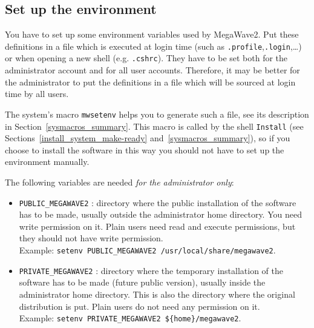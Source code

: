 


\subsection{Set up the environment}
\label{install_system_set-up}

You have to set up some environment variables used by MegaWave2.
Put these definitions in a file which is executed at login time (such as \verb+.profile+,\verb+.login+,\ldots) or when opening a new shell (e.g. \verb+.cshrc+).
They have to be set both for the administrator account and for all user accounts.
Therefore, it may be better for the administrator to put the definitions in a file which will be sourced at login time by all users.

The system's macro \verb+mwsetenv+ helps you to generate such a file, 
see its description in Section~\ref{sysmacros_summary}. 
This macro is called by the shell \verb+Install+ (see 
Sections~\ref{install_system_make-ready} and~\ref{sysmacros_summary}), so if you choose to install the software
in this way you should not have to set up the environment manually.

The following variables are needed {\em for the administrator only}:
\begin{itemize}
\item \verb+PUBLIC_MEGAWAVE2+ : 
directory where the public installation of the software has to be made, 
usually outside the administrator home directory.
You need write permission on it. Plain users need read and execute permissions, but they should not have write 
permission.\\
\nopagebreak
Example: \verb+setenv PUBLIC_MEGAWAVE2 /usr/local/share/megawave2+.
\item \verb+PRIVATE_MEGAWAVE2+ : 
directory where the temporary installation of the software has to be made
(future public version), usually inside the administrator home directory. This is also the directory where
the original distribution is put. Plain users do not need any permission on it. \\
\nopagebreak
Example: \verb+setenv PRIVATE_MEGAWAVE2 ${home}/megawave2+.
\end{itemize}

